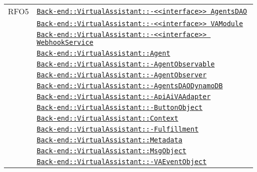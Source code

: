 \begin{longtable}{|>{\centering}m{3cm}|m{10cm}<{\centering}|}
RFO5 & \hyperref[Back-end::VirtualAssistant::<<interface>> AgentsDAO]{\texttt{Back-end::VirtualAssistant::-\linebreak <<interface>> AgentsDAO}}\\
& \hyperref[Back-end::VirtualAssistant::<<interface>> VAModule]{\texttt{Back-end::VirtualAssistant::-\linebreak <<interface>> VAModule}}\\
& \hyperref[Back-end::VirtualAssistant::<<interface>> WebhookService]{\texttt{Back-end::VirtualAssistant::-\linebreak <<interface>> WebhookService}}\\
& \hyperref[Back-end::VirtualAssistant::Agent]{\texttt{Back-end::VirtualAssistant::Agent}}\\
& \hyperref[Back-end::VirtualAssistant::AgentObservable]{\texttt{Back-end::VirtualAssistant::-\linebreak AgentObservable}}\\
& \hyperref[Back-end::VirtualAssistant::AgentObserver]{\texttt{Back-end::VirtualAssistant::-\linebreak AgentObserver}}\\
& \hyperref[Back-end::VirtualAssistant::AgentsDAODynamoDB]{\texttt{Back-end::VirtualAssistant::-\linebreak AgentsDAODynamoDB}}\\
& \hyperref[Back-end::VirtualAssistant::ApiAiVAAdapter]{\texttt{Back-end::VirtualAssistant::-\linebreak ApiAiVAAdapter}}\\
& \hyperref[Back-end::VirtualAssistant::ButtonObject]{\texttt{Back-end::VirtualAssistant::-\linebreak ButtonObject}}\\
& \hyperref[Back-end::VirtualAssistant::Context]{\texttt{Back-end::VirtualAssistant::Context}}\\
& \hyperref[Back-end::VirtualAssistant::Fulfillment]{\texttt{Back-end::VirtualAssistant::-\linebreak Fulfillment}}\\
& \hyperref[Back-end::VirtualAssistant::Metadata]{\texttt{Back-end::VirtualAssistant::Metadata}}\\
& \hyperref[Back-end::VirtualAssistant::MsgObject]{\texttt{Back-end::VirtualAssistant::MsgObject}}\\
& \hyperref[Back-end::VirtualAssistant::VAEventObject]{\texttt{Back-end::VirtualAssistant::-\linebreak VAEventObject}}\\

\end{longtable}

